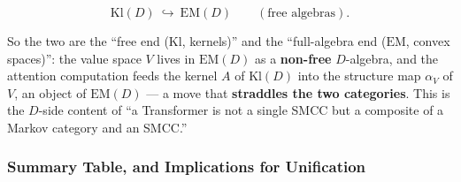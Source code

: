 \documentclass[a4paper,11pt]{article}
\begin{document}
\[\mathrm{Kl}(D)\ \hookrightarrow\ \mathrm{EM}(D)\qquad(\text{free algebras}).\]

So the two are the ``free end (\(\mathrm{Kl}\), kernels)'' and the
``full-algebra end (\(\mathrm{EM}\), convex spaces)'': the value space
\(V\) lives in \(\mathrm{EM}(D)\) as a \textbf{non-free} \(D\)-algebra,
and the attention computation feeds the kernel \(A\) of
\(\mathrm{Kl}(D)\) into the structure map \(\alpha_V\) of \(V\), an
object of \(\mathrm{EM}(D)\) --- a move that \textbf{straddles the two
categories}. This is the \(D\)-side content of ``a Transformer is not a
single SMCC but a composite of a Markov category and an SMCC.''

\hypertarget{summary-table-and-implications-for-unification}{%
\subsubsection{Summary Table, and Implications for Unification}\label{summary-table-and-implications-for-unification}}
\end{document}

